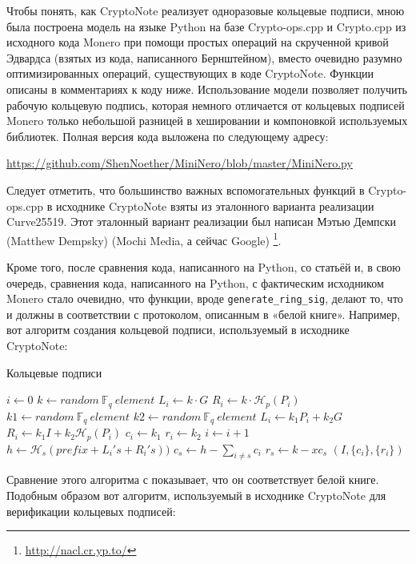 \documentclass{mrl}
\numberwithin{equation}{section}
\numberwithin{figure}{section}
\begin{document}
Чтобы понять, как CryptoNote реализует одноразовые кольцевые подписи, мною была построена модель на языке Python на базе Crypto-ops.cpp и Crypto.cpp из исходного кода Monero при помощи простых операций на скрученной кривой Эдвардса (взятых из кода, написанного Бернштейном), вместо очевидно разумно оптимизированных операций, существующих в коде CryptoNote. Функции описаны в комментариях к коду ниже. Использование модели позволяет получить рабочую кольцевую подпись, которая немного отличается от кольцевых подписей Monero только небольшой разницей в хешировании и компоновкой используемых библиотек. Полная версия кода выложена по следующему адресу:
\begin{center}
\url{https://github.com/ShenNoether/MiniNero/blob/master/MiniNero.py}
\end{center}
Следует отметить, что большинство важных вспомогательных функций в Crypto-ops.cpp в исходнике CryptoNote взяты из эталонного варианта реализации Curve25519. Этот эталонный вариант реализации был написан Мэтью Демпски (Matthew Dempsky) (Mochi Media, а сейчас Google)%
\footnote{\url{http://nacl.cr.yp.to/}%
}.

Кроме того, после сравнения кода, написанного на Python, со статьёй и, в свою очередь, сравнения кода, написанного на Python, с фактическим исходником Monero стало очевидно, что функции, вроде \texttt{generate\_ring\_sig}, делают то, что и должны в соответствии с протоколом, описанным в «белой книге». Например, вот алгоритм создания кольцевой подписи, используемый в исходнике CryptoNote:

\begin{algorithm}[H]
\caption{Кольцевые подписи}

\begin{algorithmic}
\State $i\gets 0$
		\State $k \gets random\ \mathbb{F}_q\  element$
		\State $L_i \gets k \cdot G$
		\State $R_i \gets k\cdot \mathcal{H}_p(P_i)$
	\Else
		\State $k1 \gets random\ \mathbb{F}_q\  element$
		\State $k2 \gets random\ \mathbb{F}_q\  element$
		\State $L_i\gets k_1 P_i + k_2  G$
		\State $R_i\gets k_1 I+k_2 \mathcal{H}_p(P_i)$
		\State $c_i \gets k_1$
		\State $r_i \gets k_2$
	\EndIf
	\State $i \gets i+1$
\EndWhile
\State $h \gets \mathcal{H}_s(prefix+L_i's+R_i's))$
\State $c_{s} \gets h-\sum_{i\neq s} c_i$
\State $r_s \gets k - x c_s$
\State \Return $(I, \{c_{i}\}, \{r_i\})$
\end{algorithmic}
\end{algorithm}

Сравнение этого алгоритма с \cite{CN} показывает, что он соответствует белой книге. Подобным образом вот алгоритм, используемый в исходнике CryptoNote для верификации кольцевых подписей:
\end{document}
